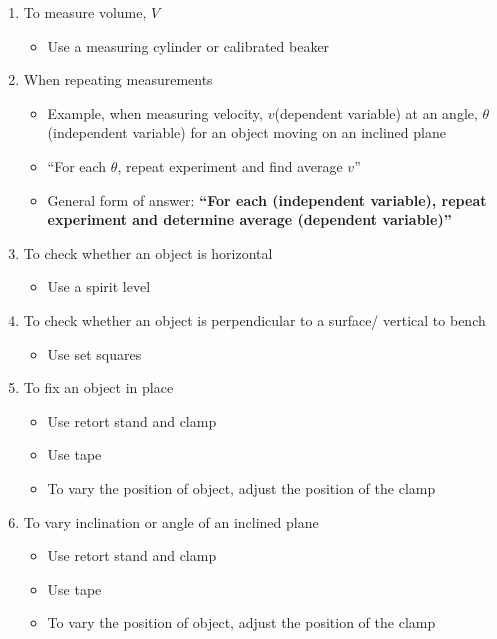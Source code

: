 \documentclass{article}
\begin{document}
\begin{enumerate}
\item To measure volume, $V$
\begin{itemize}
    \item Use a measuring cylinder or calibrated beaker
\end{itemize}

\item When repeating measurements
\begin{itemize}
    \item Example, when measuring velocity, $v$(dependent variable) at an angle, $\theta$(independent variable) for an object moving on an inclined plane
\item	“For each $\theta$, repeat experiment and find average $v$”
\item	General form of answer: \textbf{“For each (independent variable), repeat experiment and determine average (dependent variable)”}
\end{itemize}

\item To check whether an object is horizontal 
\begin{itemize}
    \item Use a spirit level
\end{itemize}

\item To check whether an object is perpendicular to a surface/ vertical to bench
\begin{itemize}
    \item Use set squares
\end{itemize}

\item To fix an object in place
\begin{itemize}
    \item Use retort stand and clamp
\item	Use tape
\item 	To vary the position of object, adjust the position of the clamp
\end{itemize}

\item To vary inclination or angle of an inclined plane 
\begin{itemize}
    \item 	Use retort stand and clamp
\item	Use tape
\item 	To vary the position of object, adjust the position of the clamp
\end{itemize}


\end{enumerate}
\end{document}
